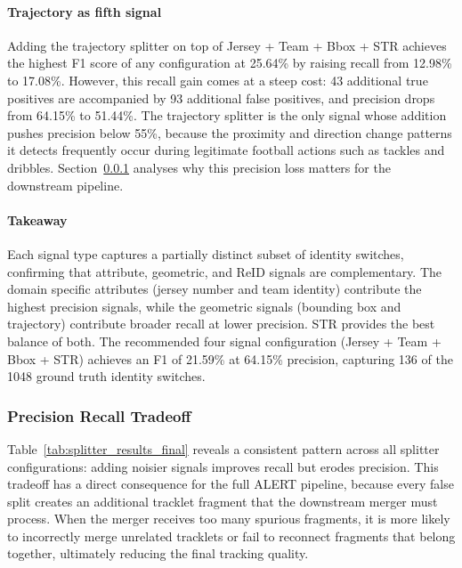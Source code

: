 \paragraph{Trajectory as fifth signal}
Adding the trajectory splitter on top of Jersey + Team + Bbox + STR achieves the highest F1 score of any configuration at 25.64\% by raising recall from 12.98\% to 17.08\%. However, this recall gain comes at a steep cost: 43 additional true positives are accompanied by 93 additional false positives, and precision drops from 64.15\% to 51.44\%. The trajectory splitter is the only signal whose addition pushes precision below 55\%, because the proximity and direction change patterns it detects frequently occur during legitimate football actions such as tackles and dribbles. Section~\ref{sec:precision_recall_tradeoff} analyses why this precision loss matters for the downstream pipeline.

\paragraph{Takeaway}
Each signal type captures a partially distinct subset of identity switches, confirming that attribute, geometric, and ReID signals are complementary. The domain specific attributes (jersey number and team identity) contribute the highest precision signals, while the geometric signals (bounding box and trajectory) contribute broader recall at lower precision. STR provides the best balance of both. The recommended four signal configuration (Jersey + Team + Bbox + STR) achieves an F1 of 21.59\% at 64.15\% precision, capturing 136 of the 1048 ground truth identity switches.


\subsubsection{Precision Recall Tradeoff}\label{sec:precision_recall_tradeoff}

Table~\ref{tab:splitter_results_final} reveals a consistent pattern across all splitter configurations: adding noisier signals improves recall but erodes precision. This tradeoff has a direct consequence for the full ALERT pipeline, because every false split creates an additional tracklet fragment that the downstream merger must process. When the merger receives too many spurious fragments, it is more likely to incorrectly merge unrelated tracklets or fail to reconnect fragments that belong together, ultimately reducing the final tracking quality.

